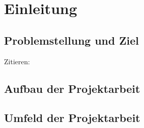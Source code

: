\section{Einleitung}

	\subsection{Problemstellung und Ziel}
	
		Zitieren: \autocite[Vgl.][66]{Foerste.2022}
		
		
		\lipsum 
		
	\subsection{Aufbau der Projektarbeit}
	
		\lipsum   
		
	\subsection{Umfeld der Projektarbeit}
	
		\lipsum
	